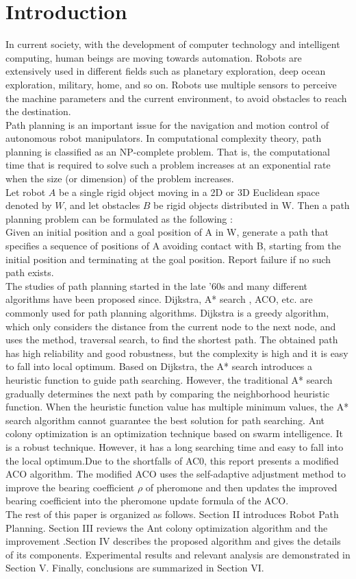 \documentclass[conference]{IEEEtran}
\begin{document}
\section{Introduction}
In current society, with the development of computer technology and intelligent computing, human beings are moving towards automation. Robots are extensively used in different fields such as planetary exploration, deep ocean exploration, military, home, and so on. Robots use multiple sensors to perceive the machine parameters and the current environment, to avoid obstacles to reach the destination. \cite{9148277} \\
Path planning is an important issue for the navigation and motion control of autonomous robot manipulators. In computational complexity theory, path planning is classified as an NP-complete problem. That is, the computational time that is required to solve such a problem increases at an exponential rate when the size (or dimension) of the problem increases.\\
Let robot $A$ be a single rigid object moving in a 2D or 3D Euclidean space denoted by $W$, and let obstacles $B$ be rigid objects distributed in W.  Then a path planning problem can be formulated as the following :\\ 
Given an initial position and a goal position  of A in W, generate a path that specifies a sequence of positions of A avoiding contact with B, starting from the initial position and terminating at the goal position. Report failure if no such path exists. \cite{5541300}\\
The studies of path planning started in the late '60s and many different algorithms have been proposed since. Dijkstra, A* search , ACO, etc. are commonly used for path planning algorithms. Dijkstra is a greedy algorithm, which only considers the distance from the current node to the next node, and uses the method, traversal search, to find the shortest path. The obtained path has high reliability and good robustness, but the complexity is high and it is easy to fall into local optimum. Based on Dijkstra, the A* search introduces a heuristic function to guide path searching. However, the traditional A* search gradually determines the next path by comparing the neighborhood heuristic function. When the heuristic function value has multiple minimum values, the A* search algorithm cannot guarantee the best solution for path searching.  Ant colony optimization is an optimization technique based on swarm intelligence. It is a robust technique. However, it has a long searching time and easy to fall into the local optimum.Due to the shortfalls of AC0, this report presents a modified ACO algorithm.  The modified ACO uses the self-adaptive adjustment method to improve the bearing coefficient $\rho$ of pheromone and then updates the improved bearing coefficient into the pheromone update formula of the ACO.\cite{8991502}\\
The rest of this paper is organized as follows. Section II introduces Robot Path Planning. Section III reviews the Ant colony optimization algorithm and the improvement .Section IV describes the proposed algorithm and gives the details of its components. Experimental results and relevant analysis are demonstrated in Section V.  Finally,
conclusions are summarized in Section VI.
\end{document}
